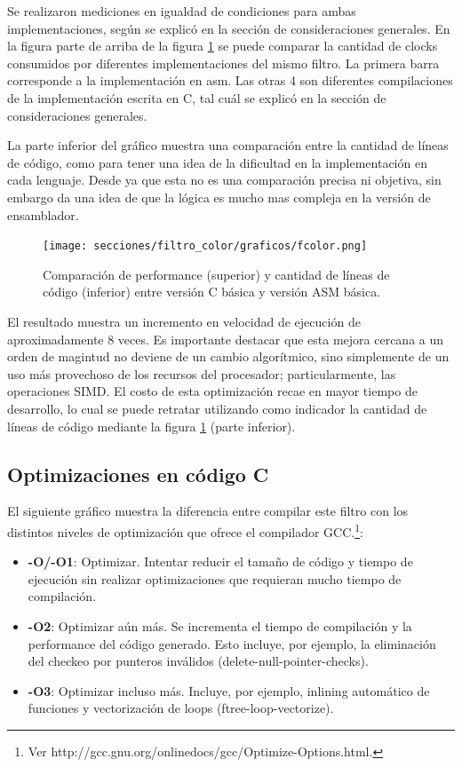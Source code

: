 	Se realizaron mediciones en igualdad de condiciones para ambas implementaciones,
según se explicó en la sección de consideraciones generales. En la figura parte de arriba
de la figura \ref{fig:filtro-color-C-vs-ASM} se puede comparar la cantidad de clocks 
consumidos por diferentes implementaciones del mismo filtro.
	La primera barra corresponde a la implementación en asm. Las otras 4 son diferentes
compilaciones de la implementación escrita en C, tal cuál se explicó en la sección de
consideraciones generales.
	
	La parte inferior del gráfico muestra una comparación entre la cantidad de líneas
de código, como para tener una idea de la dificultad en la implementación en cada
lenguaje. Desde ya que esta no es una comparación precisa ni objetiva, sin embargo da una
idea de que la lógica es mucho mas compleja en la versión de ensamblador.




\begin{figure}[H]
\begin{center}
  \texttt{[image: secciones/filtro\_color/graficos/fcolor.png]}
\end{center}
\caption{Comparación de performance (superior) y cantidad de líneas de código (inferior) entre versión C básica y versión ASM básica.}
\label{fig:filtro-color-C-vs-ASM}
\end{figure}

El resultado muestra un incremento en velocidad de ejecución de aproximadamente 8 veces. Es importante destacar que esta mejora cercana a un orden de magintud no deviene de un cambio algorítmico, sino simplemente de un uso más provechoso de los recursos del procesador; particularmente, las operaciones SIMD. El costo de esta optimización recae en mayor tiempo de desarrollo, lo cual se puede retratar utilizando como indicador la cantidad de líneas de código mediante la figura \ref{fig:filtro-color-C-vs-ASM} (parte inferior).


\subsection{Optimizaciones en código C}
\label{sub:filtro-color-optimizaciones-c}

El siguiente gráfico muestra la diferencia entre compilar este filtro con los distintos niveles de optimización
que ofrece el compilador GCC.\footnote{Ver http://gcc.gnu.org/onlinedocs/gcc/Optimize-Options.html.}:

\begin{itemize}
	\item \textbf{-O/-O1}: Optimizar. Intentar reducir el tamaño de código y tiempo de ejecución sin realizar optimizaciones que requieran mucho tiempo de compilación.
	\item \textbf{-O2}: Optimizar aún más. Se incrementa el tiempo de compilación y la performance del código generado. Esto incluye, por ejemplo, la eliminación del checkeo por punteros inválidos (delete-null-pointer-checks).
	\item \textbf{-O3}: Optimizar incluso más. Incluye, por ejemplo, inlining automático de funciones y vectorización de loops (ftree-loop-vectorize).
\end{itemize}


